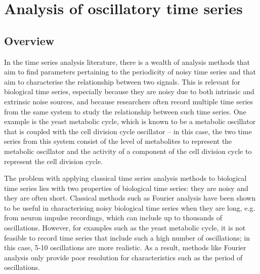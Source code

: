 
\chapter{Analysis of oscillatory time series}
\label{ch:analysis}

\section{Overview}
\label{sec:analysis-overview}


In the time series analysis literature, there is a wealth of analysis methods that aim to find parameters pertaining to the periodicity of noisy time series and that aim to characterise the relationship between two signals.
This is relevant for biological time series, especially because they are noisy due to both intrinsic and extrinsic noise sources, and because researchers often record multiple time series from the same system to study the relationship between such time series.
One example is the yeast metabolic cycle, which is known to be a metabolic oscillator that is coupled with the cell division cycle oscillator -- in this case, the two time series from this system consist of the level of metabolites to represent the metabolic oscillator and the activity of a component of the cell division cycle to represent the cell division cycle.

The problem with applying classical time series analysis methods to biological time series lies with two properties of biological time series: they are noisy and they are often short.
Classical methods such as Fourier analysis have been shown to be useful in characterising noisy biological time series when they are long, e.g. from neuron impulse recordings, which can include up to thousands of oscillations.
However, for examples such as the yeast metabolic cycle, it is not feasible to record time series that include such a high number of oscillations; in this case, 5-10 oscillations are more realistic.
As a result, methods like Fourier analysis only provide poor resolution for characteristics such as the period of oscillations.

